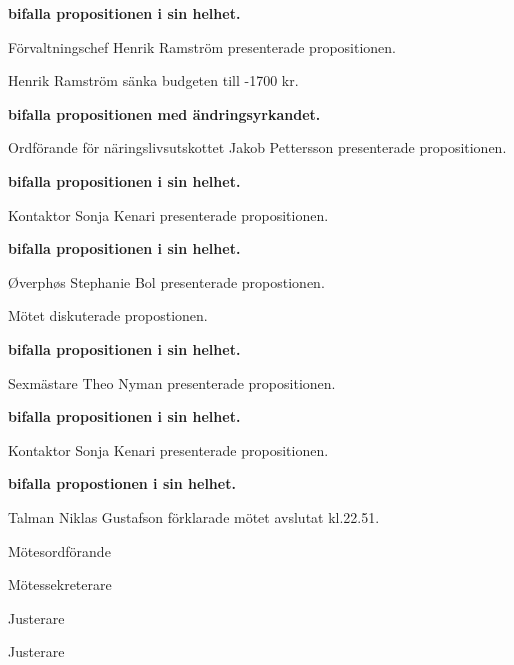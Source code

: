 \documentclass[10pt]{article}
\def\mo{Niklas Gustafson}
\def\ms{Sonja Kenari}
\def\ji{Rasmus Sobel}
\def\jii{Sophia Carlsson}
\begin{document}
\begin{paragrafer}
\begin{paragrafer}
      \textbf{\Mba bifalla propositionen i sin helhet.}

      Förvaltningschef Henrik Ramström presenterade propositionen.

      Henrik Ramström \ypa sänka budgeten till -1700 kr.

      \textbf{\Mba bifalla propositionen med ändringsyrkandet.}

      Ordförande för näringslivsutskottet Jakob Pettersson presenterade propositionen.

        \textbf{\Mba bifalla propositionen i sin helhet.}

      Kontaktor Sonja Kenari presenterade propositionen.

      \textbf{\Mba bifalla propositionen i sin helhet.}

       Øverphøs Stephanie Bol presenterade propostionen.

      Mötet diskuterade propostionen.

      \textbf{\Mba bifalla propositionen i sin helhet.}

      Sexmästare Theo Nyman presenterade propositionen.

      \textbf{\Mba bifalla propositionen i sin helhet.}

      Kontaktor Sonja Kenari presenterade propositionen.

      \textbf{\Mba bifalla propostionen i sin helhet.}

  \end{paragrafer}
Talman {\mo} förklarade mötet avslutat kl.22.51.

\end{paragrafer}

\hidesignfoot
\begin{signatures}{4}
\signature{\mo}{Mötesordförande}
\signature{\ms}{Mötessekreterare}
\signature{\ji}{Justerare}
\signature{\jii}{Justerare}
\end{signatures}
\end{document}
